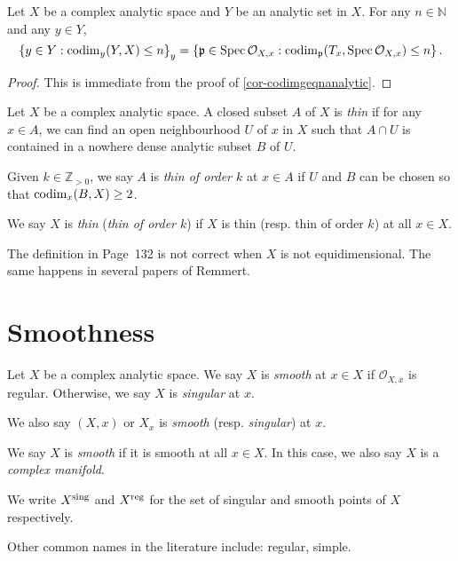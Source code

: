 \begin{corollary}\label{cor-codimgeqngerm}
    Let $X$ be a complex analytic space and $Y$ be an analytic set in $X$. For any $n\in \mathbb{N}$ and any $y\in Y$,
    \[
        \left\{ y\in Y: \operatorname{codim}_y(Y,X)\leq n\right\}_y=\left\{\mathfrak{p}\in \operatorname{Spec} \mathcal{O}_{X,x}: \operatorname{codim}_{\mathfrak{p}}(T_x,\operatorname{Spec} \mathcal{O}_{X,x})\leq n \right\}.
    \]
\end{corollary}
\begin{proof}
    This is immediate from the proof of \cref{cor-codimgeqnanalytic}.
\end{proof}

\begin{definition}
    Let $X$ be a complex analytic space. A closed subset $A$ of $X$ is \emph{thin} if for any $x \in A$, we can find an open neighbourhood $U$ of $x$ in $X$ such that $A\cap U$ is contained in a nowhere dense analytic subset $B$ of $U$. 

    Given $k\in \mathbb{Z}_{>0}$, we say $A$ is \emph{thin of order $k$} at $x\in A$ if $U$ and $B$ can be chosen so that $\operatorname{codim}_x(B,X)\geq 2$.

    We say $X$ is \emph{thin} (\emph{thin of order $k$}) if $X$ is thin (resp. thin of order $k$) at all $x\in X$.
\end{definition}
The definition in \cite{CAS} Page~132 is not correct when $X$ is not equidimensional. The same happens in several papers of Remmert.



\section{Smoothness}

\begin{definition}
    Let $X$ be a complex analytic space. We say $X$ is \emph{smooth} at $x\in X$ if $\mathcal{O}_{X,x}$ is regular. Otherwise, we say $X$ is \emph{singular} at $x$.

    We also say $(X,x)$ or $X_x$ is \emph{smooth} (resp. \emph{singular}) at $x$.
    
    We say $X$ is \emph{smooth} if it is smooth at all $x\in X$. In this case, we also say $X$ is a \emph{complex manifold}.

    We write $X^{\operatorname{sing}}$ and $X^{\operatorname{reg}}$ for the set of singular and smooth points of $X$ respectively.
\end{definition}
Other common names in the literature include: regular, simple.

